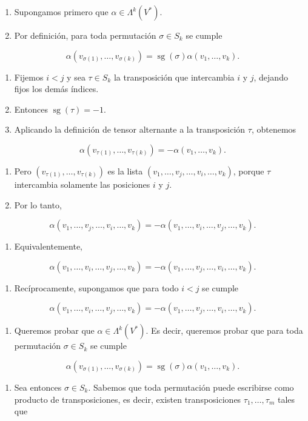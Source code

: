 \begin{bookproof}{}
\begin{enumerate}
\item Supongamos primero que $\alpha\in\Lambda^k(V^*)$.
\item Por definición, para toda permutación $\sigma\in S_k$ se cumple
\end{enumerate}
\[
\alpha(v_{\sigma(1)},\dots,v_{\sigma(k)})=\operatorname{sg}(\sigma)\alpha(v_1,\dots,v_k).
\]
\begin{enumerate}[start=3]
\item Fijemos $i<j$ y sea $\tau\in S_k$ la transposición que intercambia $i$ y $j$, dejando fijos los demás índices.
\item Entonces $\operatorname{sg}(\tau)=-1$.
\item Aplicando la definición de tensor alternante a la transposición $\tau$, obtenemos
\end{enumerate}
\[
\alpha(v_{\tau(1)},\dots,v_{\tau(k)})=-\alpha(v_1,\dots,v_k).
\]
\begin{enumerate}[start=6]
\item Pero $(v_{\tau(1)},\dots,v_{\tau(k)})$ es la lista $(v_1,\dots,v_j,\dots,v_i,\dots,v_k)$, porque $\tau$ intercambia solamente las posiciones $i$ y $j$.
\item Por lo tanto,
\end{enumerate}
\[
\alpha(v_1,\dots,v_j,\dots,v_i,\dots,v_k)=-\alpha(v_1,\dots,v_i,\dots,v_j,\dots,v_k).
\]
\begin{enumerate}[start=8]
\item Equivalentemente,
\end{enumerate}
\[
\alpha(v_1,\dots,v_i,\dots,v_j,\dots,v_k)=-\alpha(v_1,\dots,v_j,\dots,v_i,\dots,v_k).
\]
\begin{enumerate}[start=9]
\item Recíprocamente, supongamos que para todo $i<j$ se cumple
\end{enumerate}
\[
\alpha(v_1,\dots,v_i,\dots,v_j,\dots,v_k)=-\alpha(v_1,\dots,v_j,\dots,v_i,\dots,v_k).
\]
\begin{enumerate}[start=10]
\item Queremos probar que $\alpha\in\Lambda^k(V^*)$. Es decir, queremos probar que para toda permutación $\sigma\in S_k$ se cumple
\end{enumerate}
\[
\alpha(v_{\sigma(1)},\dots,v_{\sigma(k)})=\operatorname{sg}(\sigma)\alpha(v_1,\dots,v_k).
\]
\begin{enumerate}[start=11]
\item Sea entonces $\sigma\in S_k$. Sabemos que toda permutación puede escribirse como producto de transposiciones, es decir, existen transposiciones $\tau_1,\dots,\tau_m$ tales que

\end{enumerate}
\end{bookproof}
